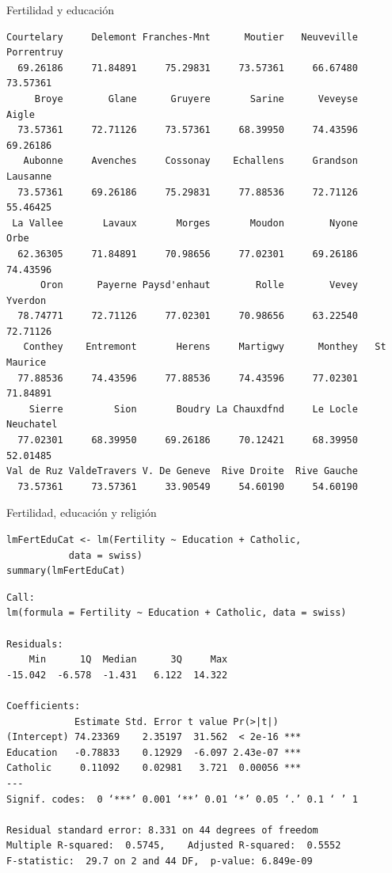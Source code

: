 \documentclass[xcolor={usenames,svgnames,dvipsnames}]{beamer}
\begin{document}
\begin{frame}[fragile,label=sec-3-2]{Fertilidad y educación}
\begin{verbatim}
Courtelary     Delemont Franches-Mnt      Moutier   Neuveville   Porrentruy 
  69.26186     71.84891     75.29831     73.57361     66.67480     73.57361 
     Broye        Glane      Gruyere       Sarine      Veveyse        Aigle 
  73.57361     72.71126     73.57361     68.39950     74.43596     69.26186 
   Aubonne     Avenches     Cossonay    Echallens     Grandson     Lausanne 
  73.57361     69.26186     75.29831     77.88536     72.71126     55.46425 
 La Vallee       Lavaux       Morges       Moudon        Nyone         Orbe 
  62.36305     71.84891     70.98656     77.02301     69.26186     74.43596 
      Oron      Payerne Paysd'enhaut        Rolle        Vevey      Yverdon 
  78.74771     72.71126     77.02301     70.98656     63.22540     72.71126 
   Conthey    Entremont       Herens     Martigwy      Monthey   St Maurice 
  77.88536     74.43596     77.88536     74.43596     77.02301     71.84891 
    Sierre         Sion       Boudry La Chauxdfnd     Le Locle    Neuchatel 
  77.02301     68.39950     69.26186     70.12421     68.39950     52.01485 
Val de Ruz ValdeTravers V. De Geneve  Rive Droite  Rive Gauche 
  73.57361     73.57361     33.90549     54.60190     54.60190
\end{verbatim}
\end{frame}
\begin{frame}[fragile,label=sec-3-3]{Fertilidad, educación y religión}
 \lstset{language=R,numbers=none}
\begin{lstlisting}
lmFertEduCat <- lm(Fertility ~ Education + Catholic,
		   data = swiss)
summary(lmFertEduCat)
\end{lstlisting}

\begin{verbatim}
Call:
lm(formula = Fertility ~ Education + Catholic, data = swiss)

Residuals:
    Min      1Q  Median      3Q     Max 
-15.042  -6.578  -1.431   6.122  14.322 

Coefficients:
            Estimate Std. Error t value Pr(>|t|)    
(Intercept) 74.23369    2.35197  31.562  < 2e-16 ***
Education   -0.78833    0.12929  -6.097 2.43e-07 ***
Catholic     0.11092    0.02981   3.721  0.00056 ***
---
Signif. codes:  0 ‘***’ 0.001 ‘**’ 0.01 ‘*’ 0.05 ‘.’ 0.1 ‘ ’ 1

Residual standard error: 8.331 on 44 degrees of freedom
Multiple R-squared:  0.5745,	Adjusted R-squared:  0.5552 
F-statistic:  29.7 on 2 and 44 DF,  p-value: 6.849e-09
\end{verbatim}
\end{frame}
\end{document}
